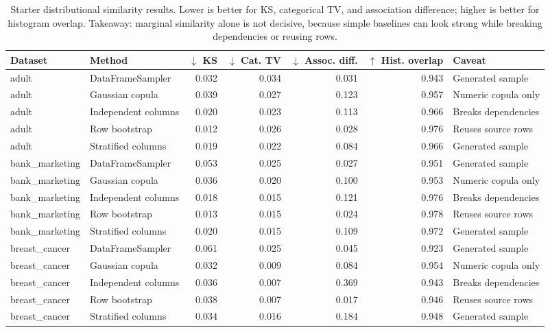\begin{table}
\caption{Starter distributional similarity results. Lower is better for KS, categorical TV, and association difference; higher is better for histogram overlap. Takeaway: marginal similarity alone is not decisive, because simple baselines can look strong while breaking dependencies or reusing rows.}
\label{tab:distributional-similarity}
\begin{adjustbox}{max width=\columnwidth}
\begin{tabular}{llrrrrl}
\toprule
Dataset & Method & $\downarrow$ KS & $\downarrow$ Cat. TV & $\downarrow$ Assoc. diff. & $\uparrow$ Hist. overlap & Caveat \\
\midrule
adult & DataFrameSampler & 0.032 & 0.034 & 0.031 & 0.943 & Generated sample \\
adult & Gaussian copula & 0.039 & 0.027 & 0.123 & 0.957 & Numeric copula only \\
adult & Independent columns & 0.020 & 0.023 & 0.113 & 0.966 & Breaks dependencies \\
adult & Row bootstrap & 0.012 & 0.026 & 0.028 & 0.976 & Reuses source rows \\
adult & Stratified columns & 0.019 & 0.022 & 0.084 & 0.966 & Generated sample \\
bank\_marketing & DataFrameSampler & 0.053 & 0.025 & 0.027 & 0.951 & Generated sample \\
bank\_marketing & Gaussian copula & 0.036 & 0.020 & 0.100 & 0.953 & Numeric copula only \\
bank\_marketing & Independent columns & 0.018 & 0.015 & 0.121 & 0.976 & Breaks dependencies \\
bank\_marketing & Row bootstrap & 0.013 & 0.015 & 0.024 & 0.978 & Reuses source rows \\
bank\_marketing & Stratified columns & 0.020 & 0.015 & 0.109 & 0.972 & Generated sample \\
breast\_cancer & DataFrameSampler & 0.061 & 0.025 & 0.045 & 0.923 & Generated sample \\
breast\_cancer & Gaussian copula & 0.032 & 0.009 & 0.084 & 0.954 & Numeric copula only \\
breast\_cancer & Independent columns & 0.036 & 0.007 & 0.369 & 0.943 & Breaks dependencies \\
breast\_cancer & Row bootstrap & 0.038 & 0.007 & 0.017 & 0.946 & Reuses source rows \\
breast\_cancer & Stratified columns & 0.034 & 0.016 & 0.184 & 0.948 & Generated sample \\

\end{tabular}
\end{adjustbox}
\end{table}
